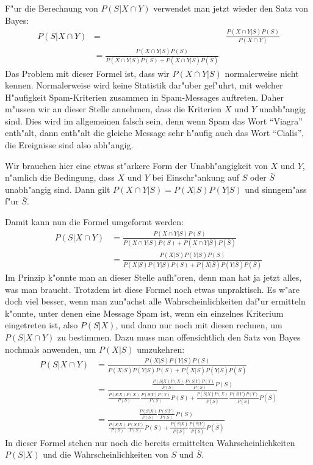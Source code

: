 F"ur die Berechnung von $P(S|X\cap Y)$ verwendet man jetzt wieder
den Satz von Bayes:
\begin{align}
P(S|X\cap Y)&=&\frac{P(X\cap Y|S)P(S)}{P(X\cap Y)}\nonumber
\\
&=
\frac{P(X\cap Y|S)P(S)}{P(X\cap Y|S)P(S)+P(X\cap Y|\bar S)P(\bar S)}
\end{align}
Das Problem mit dieser Formel ist, dass wir $P(X\cap Y|S)$ normalerweise
nicht kennen.
Normalerweise wird keine Statistik dar"uber gef"uhrt, mit
welcher H"aufigkeit Spam-Kriterien zusammen in Spam-Messages auftreten.
Daher m"ussen wir an dieser Stelle annehmen, dass die Kriterien $X$ und $Y$
unabh"angig sind.
Dies wird im allgemeinen falsch sein, denn wenn Spam
das Wort ``Viagra'' enth"alt, dann enth"alt die gleiche Message sehr h"aufig
auch das Wort ``Cialis'', die Ereignisse sind also abh"angig.

Wir brauchen hier eine etwas st"arkere Form der Unabh"angigkeit von $X$ und $Y$,
n"amlich die Bedingung, dass $X$ und $Y$ bei Einschr"ankung auf $S$
oder $\bar S$ unabh"angig sind.
Dann gilt $P(X\cap Y|S)=P(X|S)P(Y|S)$
und sinngem"ass f"ur $\bar S$.

Damit kann nun die Formel umgeformt werden:
\begin{align}
P(S|X\cap Y)
&=
\frac{P(X\cap Y|S)P(S)}{P(X\cap Y|S)P(S)+P(X\cap Y|\bar S)P(\bar S)}\nonumber
\\
&=
\frac{P(X|S)P(Y|S)P(S)}{P(X|S)P(Y|S)P(S)+P(X|\bar S)P(Y|\bar S)P(\bar S)}
\end{align}
Im Prinzip k"onnte man an dieser Stelle aufh"oren, denn man hat ja jetzt
alles, was man braucht.
Trotzdem ist diese Formel noch etwas unpraktisch.
Es w"are doch viel besser, wenn man zun"achst alle Wahrscheinlichkeiten
daf"ur ermitteln k"onnte, unter denen eine Message Spam ist, wenn ein
einzelnes Kriterium eingetreten ist, also $P(S|X)$, und dann nur noch
mit diesen rechnen, um $P(S|X\cap Y)$ zu bestimmen.
Dazu muss man offensichtlich den Satz von Bayes nochmals anwenden, um
$P(X|S)$ umzukehren:
\begin{align}
P(S|X\cap Y)
&=
\frac{P(X|S)P(Y|S)P(S)}{P(X|S)P(Y|S)P(S)+P(X|\bar S)P(Y|\bar S)P(\bar S)}\nonumber
\\
&=\frac{\displaystyle
\frac{P(S|X)P(X)}{P(S)}
\frac{P(S|Y)P(Y)}{P(S)}P(S)
}{\displaystyle
\frac{P(S|X)P(X)}{P(S)}
\frac{P(S|Y)P(Y)}{P(S)}P(S)
+
\frac{P(\bar S|X)P(X)}{P(\bar S)}
\frac{P(\bar S|Y)P(Y)}{P(\bar S)}P(\bar S)
}\nonumber
\\
&=
\frac{\displaystyle
\frac{P(S|X)}{P(S)}
\frac{P(S|Y)}{P(S)}P(S)
}{\displaystyle
\frac{P(S|X)}{P(S)}
\frac{P(S|Y)}{P(S)}P(S)
+
\frac{P(\bar S|X)}{P(\bar S)}
\frac{P(\bar S|Y)}{P(\bar S)}P(\bar S)
}
\end{align}
In dieser Formel stehen nur noch die bereits ermittelten Wahrscheinlichkeiten
$P(S|X)$ und die Wahrscheinlichkeiten von $S$ und $\bar S$.

